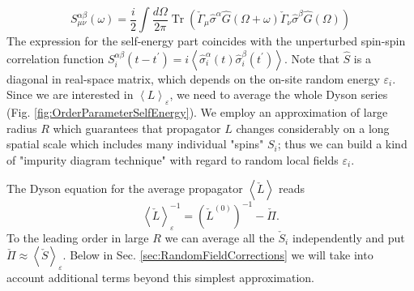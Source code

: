 \documentclass[twocolumn,english,prb]{revtex4-1}
\newcommand{\Tr}{\operatorname{Tr}}
\begin{document}
\begin{equation}
\label{eq:OrderParameterSelfEnergy}
S_{\mu\nu}^{\alpha\beta}(\omega)=\frac{i}{2}\int\frac{d\Omega}{2 \pi}\Tr(\check{\Gamma}_{\mu}\hat{\sigma}^{\alpha}\hat{G}(\Omega + \omega)\check{\Gamma}_{\nu}\hat{\sigma}^{\beta}\hat{G}(\Omega))
\end{equation}
The expression for the self-energy part coincides with the unperturbed spin-spin correlation function 
$S^{\alpha \beta}_i(t-t^\prime) = i \left\langle\hat{\sigma}^\alpha_i (t) \hat{\sigma}^\beta_i(t^\prime)\right\rangle$. 
Note that $\hat{S}$ is  a diagonal in real-space matrix, which depends on the on-site random energy $\varepsilon_i$.
 Since we are interested in $\left\langle L\right\rangle_{\varepsilon}$, we need to average the whole Dyson series (Fig. \ref{fig:OrderParameterSelfEnergy}). 
We employ an approximation of large radius $R$ which guarantees that propagator $L$ changes considerably
 on a long spatial scale which includes many individual "spins" $S_i$; thus we  can build  a kind of  "impurity diagram technique" with regard to random local fields $\varepsilon_i$.


The Dyson equation for the average propagator $ \left\langle \check{L}\right\rangle$ reads
\begin{equation}
\label{eq:DysonDisorder}
\left\langle \check{L}\right\rangle_{\varepsilon} ^{-1}=(\check{L}^{(0)})^{-1}-\check{\Pi}.
\end{equation}
To the leading order in large $R$ we can average all the $\check{S}_i$ independently and put $\check{\Pi} \approx \left\langle \check{S}\right\rangle_{\varepsilon}$. 
Below in Sec. \ref{sec:RandomFieldCorrections} we will take into account additional terms
beyond this simplest approximation. 
\end{document}
